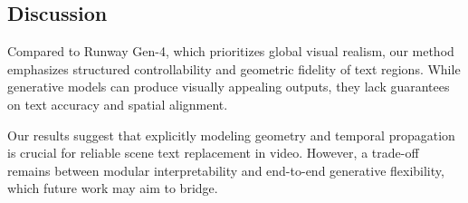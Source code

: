 \subsection{Discussion}

Compared to Runway Gen-4, which prioritizes global visual realism, our method emphasizes structured controllability and geometric fidelity of text regions. While generative models can produce visually appealing outputs, they lack guarantees on text accuracy and spatial alignment.

Our results suggest that explicitly modeling geometry and temporal propagation is crucial for reliable scene text replacement in video. However, a trade-off remains between modular interpretability and end-to-end generative flexibility, which future work may aim to bridge.